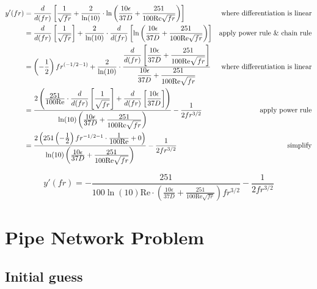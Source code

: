 \documentclass{article}
\newcommand{\deriv}[2]{\frac{d#1}{d#2}}
\newcommand{\ddfrac}[2]{\frac{\displaystyle #1}{\displaystyle #2}}
\begin{document}
\begin{align*}
    y'(fr) &= \deriv{}{(fr)} \left[ \frac{1}{\sqrt{fr}} + \frac{2}{\ln(10)} \cdot \ln\left(\frac{10\epsilon}{37D} +
    \frac{251}{100\mathrm{Re}\sqrt{fr}}\right) \right] & \text{where differentiation is linear}
    \\
    &= \deriv{}{(fr)} \left[\frac{1}{\sqrt{fr}}\right] + \frac{2}{\ln(10)} \cdot \deriv{}{(fr)} \left[ \ln\left(\frac{10\epsilon}{37D} + 
    \frac{251}{100\mathrm{Re}\sqrt{fr}}\right) \right] & \text{apply power rule \& chain rule}
    \\
    &= \left( -\frac{1}{2} \right) fr^{\left(-1/2 - 1\right)} + \frac{2}{\ln(10)} \cdot \ddfrac{\displaystyle\deriv{}{(fr)} \left[ \ddfrac{10\epsilon}{37D} + 
    \ddfrac{251}{100\mathrm{Re}\sqrt{fr}} \right]}{\ddfrac{10\epsilon}{37D} + 
    \ddfrac{251}{100\mathrm{Re}\sqrt{fr}}} & \text{where differentiation is linear}
    \\
    &= \frac{2 \left( \ddfrac{251}{100\mathrm{Re}} \cdot \displaystyle\deriv{}{(fr)} \left[ \ddfrac{1}{\sqrt{fr}} \right] 
    + \displaystyle\deriv{}{(fr)} \left[ \ddfrac{10\epsilon}{37D} \right] \right)}{\ln(10) \left( \ddfrac{10\epsilon}{37D} + 
    \ddfrac{251}{100\mathrm{Re}\sqrt{fr}} \right)}
    - \frac{1}{2fr^{3/2}} & \text{apply power rule}
    \\
    &= \frac{2 \left( 251 \left(-\ddfrac{1}{2}\right) fr^{-1/2-1} \cdot \ddfrac{1}{100\mathrm{Re}} + 0 \right)}{\ln(10) \left( \ddfrac{10\epsilon}{37D} + 
    \ddfrac{251}{100\mathrm{Re}\sqrt{fr}} \right)} 
    - \frac{1}{2fr^{3/2}} & \text{simplify}
\end{align*}
    
\begin{tcolorbox}[colback=red!5!white,colframe=red!50!black,title=Solution]
    \begin{equation*}
        y'(fr) = -\frac{251}{100 \ln(10) \mathrm{Re} \cdot \left( \ddfrac{10\epsilon}{37D} 
        + \ddfrac{251}{100\mathrm{Re}\sqrt{fr}} \right) fr^{3/2}} - \frac{1}{2fr^{3/2}}
    \end{equation*}
\end{tcolorbox}

\pagebreak

\section{Pipe Network Problem}

\subsection{Initial guess}
\end{document}
